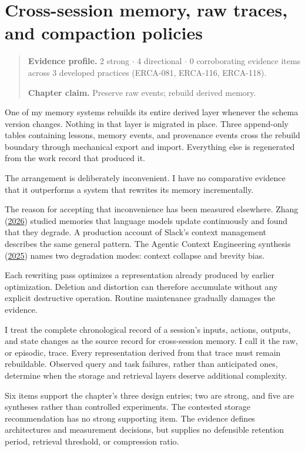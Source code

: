 \chapter{Cross-session memory, raw traces, and compaction policies}
\label{ch14-cross-session-memory-raw-traces-compaction}
\begin{quote}
\textbf{Evidence profile.} 2 strong \(\cdot\) 4 directional \(\cdot\) 0 corroborating evidence items across 3 developed practices (ERCA-081, ERCA-116, ERCA-118).

\textbf{Chapter claim.} Preserve raw events; rebuild derived memory.
\end{quote}

One of my memory systems rebuilds its entire derived layer whenever the schema version changes. Nothing in that layer is migrated in place. Three append-only tables containing lessons, memory events, and provenance events cross the rebuild boundary through mechanical export and import. Everything else is regenerated from the work record that produced it.

The arrangement is deliberately inconvenient. I have no comparative evidence that it outperforms a system that rewrites its memory incrementally.

The reason for accepting that inconvenience has been measured elsewhere. Zhang (\href{https://arxiv.org/abs/2605.12978}{2026}) studied memories that language models update continuously and found that they degrade. A production account of Slack's context management describes the same general pattern. The Agentic Context Engineering synthesis (\href{https://arxiv.org/abs/2510.04618}{2025}) names two degradation modes: context collapse and brevity bias.

Each rewriting pass optimizes a representation already produced by earlier optimization. Deletion and distortion can therefore accumulate without any explicit destructive operation. Routine maintenance gradually damages the evidence.

I treat the complete chronological record of a session's inputs, actions, outputs, and state changes as the source record for cross-session memory. I call it the raw, or episodic, trace. Every representation derived from that trace must remain rebuildable. Observed query and task failures, rather than anticipated ones, determine when the storage and retrieval layers deserve additional complexity.

Six items support the chapter's three design entries; two are strong, and five are syntheses rather than controlled experiments. The contested storage recommendation has no strong supporting item. The evidence defines architectures and measurement decisions, but supplies no defensible retention period, retrieval threshold, or compression ratio.


